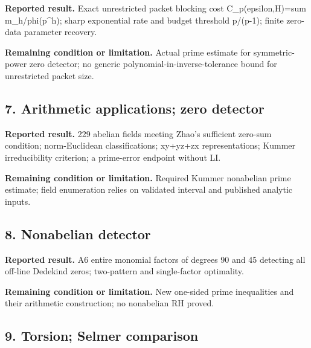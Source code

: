 \href{https://github.com/VladimirReshetnikov/ProveIt/blob/274841c1cb137aafbb60ab5f519c51fd42eee98e/docs/incoming/grh-torsion-and-zero-data.zip}{}

\textbf{Reported result.} Exact unrestricted packet blocking cost C\_p(epsilon,H)=sum m\_h/phi(p\textasciicircum{}h); sharp exponential rate and budget threshold p/(p-1); finite zero-data parameter recovery.

\textbf{Remaining condition or limitation.} Actual prime estimate for symmetric-power zero detector; no generic polynomial-in-inverse-tolerance bound for unrestricted packet size.

\subsection*{7. Arithmetic applications; zero detector}

\href{https://github.com/VladimirReshetnikov/ProveIt/blob/274841c1cb137aafbb60ab5f519c51fd42eee98e/docs/incoming/grh-transfer.zip}{}

\textbf{Reported result.} 229 abelian fields meeting Zhao's sufficient zero-sum condition; norm-Euclidean classifications; xy+yz+zx representations; Kummer irreducibility criterion; a prime-error endpoint without LI.

\textbf{Remaining condition or limitation.} Required Kummer nonabelian prime estimate; field enumeration relies on validated interval and published analytic inputs.

\subsection*{8. Nonabelian detector}

\href{https://github.com/VladimirReshetnikov/ProveIt/blob/274841c1cb137aafbb60ab5f519c51fd42eee98e/docs/incoming/grh_a6_transfer_2026-11-25.zip}{}

\textbf{Reported result.} A6 entire monomial factors of degrees 90 and 45 detecting all off-line Dedekind zeros; two-pattern and single-factor optimality.

\textbf{Remaining condition or limitation.} New one-sided prime inequalities and their arithmetic construction; no nonabelian RH proved.

\subsection*{9. Torsion; Selmer comparison}

